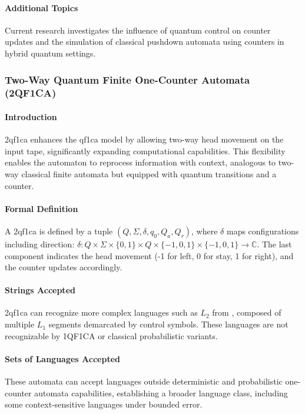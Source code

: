\paragraph{Additional Topics} 
Current research investigates the influence of quantum control on counter updates and the simulation of classical pushdown automata using counters in hybrid quantum settings.


\subsubsection{Two-Way Quantum Finite One-Counter Automata (2QF1CA)}

\paragraph{Introduction}
\gls{2qf1ca} enhances the \gls{qf1ca} model by allowing two-way head movement on the input tape, significantly expanding computational capabilities. This flexibility enables the automaton to reprocess information with context, analogous to two-way classical finite automata but equipped with quantum transitions and a counter.

\paragraph{Formal Definition}
A \gls{2qf1ca} is defined by a tuple $(Q, \Sigma, \delta, q_0, Q_a, Q_r)$, where $\delta$ maps configurations including direction: $\delta: Q \times \Sigma \times \{0,1\} \times Q \times \{-1,0,1\} \times \{-1,0,1\} \rightarrow \mathbb{C}$. The last component indicates the head movement (-1 for left, 0 for stay, 1 for right), and the counter updates accordingly.

\paragraph{Strings Accepted}
\gls{2qf1ca} can recognize more complex languages such as $L_2$ from \cite{bonner2001quantum}, composed of multiple $L_1$ segments demarcated by control symbols. These languages are not recognizable by 1QF1CA or classical probabilistic variants.

\paragraph{Sets of Languages Accepted}
These automata can accept languages outside deterministic and probabilistic one-counter automata capabilities, establishing a broader language class, including some context-sensitive languages under bounded error.

